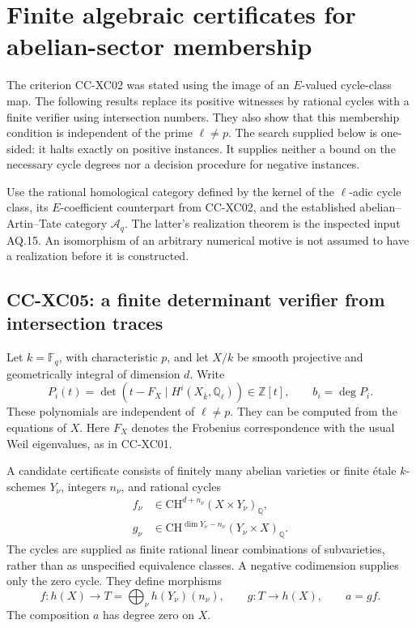 \section{Finite algebraic certificates for abelian-sector membership}

The criterion CC-XC02 was stated using the image of an
\(E\)-valued cycle-class map.  The following results replace its
positive witnesses by rational cycles with a finite verifier using
intersection numbers.  They also show that this membership condition
is independent of the prime \(\ell\ne p\).  The search supplied below
is one-sided: it halts exactly on positive instances.  It supplies
neither a bound on the necessary cycle degrees nor a decision
procedure for negative instances.

Use the rational homological category defined by the kernel of
the \(\ell\)-adic cycle class, its \(E\)-coefficient counterpart
from CC-XC02, and the established abelian--Artin--Tate category
\(\mathcal A_q\).  The latter's realization theorem is the
inspected input AQ.15.  An isomorphism of an arbitrary numerical
motive is not assumed to have a realization before it is
constructed.

\subsection{CC-XC05: a finite determinant verifier from intersection traces}

Let \(k=\mathbb F_q\), with characteristic \(p\), and let
\(X/k\) be smooth projective and geometrically integral of
dimension \(d\).  Write
\[
 P_i(t)=\det(t-F_X\mid H^i(X_{\bar k},\mathbb Q_\ell))
       \in\mathbb Z[t],\qquad b_i=\deg P_i.
                                                        \tag{CC-XC.C10}
\]
These polynomials are independent of \(\ell\ne p\).
They can be computed from the equations of \(X\).
Here \(F_X\) denotes the Frobenius correspondence with
the usual Weil eigenvalues, as in CC-XC01.

A candidate certificate consists of finitely many abelian
varieties or finite étale \(k\)-schemes \(Y_\nu\), integers
\(n_\nu\), and rational cycles
\[
 \begin{split}
 f_\nu&\in\mathrm{CH}^{d+n_\nu}(X\times Y_\nu)_{\mathbb Q},\\
 g_\nu&\in\mathrm{CH}^{\dim Y_\nu-n_\nu}
                                  (Y_\nu\times X)_{\mathbb Q}.
 \end{split}                                            \tag{CC-XC.C11}
\]
The cycles are supplied as finite rational linear combinations
of subvarieties, rather than as unspecified equivalence classes.
A negative codimension supplies only the zero cycle.
They define morphisms
\[
 f:h(X)\longrightarrow T=\bigoplus_\nu h(Y_\nu)(n_\nu),
 \qquad g:T\longrightarrow h(X),\qquad a=gf.
                                                        \tag{CC-XC.C12}
\]
The composition \(a\) has degree zero on \(X\).

